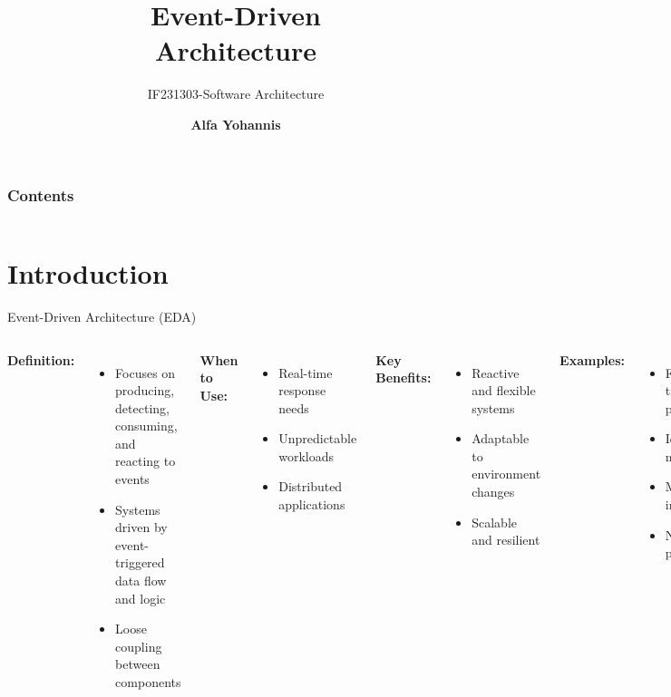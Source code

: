 \documentclass[aspectratio=169, table]{beamer}
\title{\Huge Event-Driven\\Architecture\\}
\subtitle{IF231303-Software Architecture}
\author{\textbf{Alfa Yohannis}}
\begin{document}
	
	\frame{\titlepage}
	
	
	\begin{frame}[fragile]
		\frametitle{Contents}
		\vspace{20pt}
		\begin{columns}[t]
			\tableofcontents[sections={1-5}]
			
			\tableofcontents[sections={6-10}]
		\end{columns}
	\end{frame}
		
	\section{Introduction}
	
	\begin{frame}[fragile]{Event-Driven Architecture (EDA)}
		\vspace{20pt}
		\begin{columns}[T]
			\textbf{Definition:}
			\begin{itemize}
				\item Focuses on producing, detecting, consuming, and reacting to events
				\item Systems driven by event-triggered data flow and logic
				\item Loose coupling between components
			\end{itemize}
			
			\textbf{When to Use:}
			\begin{itemize}
				\item Real-time response needs
				\item Unpredictable workloads
				\item Distributed applications
			\end{itemize}
			
			\textbf{Key Benefits:}
			\begin{itemize}
				\item Reactive and flexible systems
				\item Adaptable to environment changes
				\item Scalable and resilient
			\end{itemize}
			
			\textbf{Examples:}
			\begin{itemize}
				\item Financial transaction processing
				\item IoT sensor monitoring
				\item Microservices integration
				\item Notification platforms
			\end{itemize}
		\end{columns}
	\end{frame}
	
\end{document}
